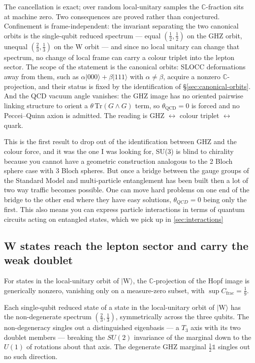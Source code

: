 The cancellation is exact; over random local-unitary samples the $\mathbb{C}$-fraction sits at
machine zero. Two consequences are proved rather than conjectured. Confinement is frame-independent:
the invariant separating the two canonical orbits is the single-qubit reduced spectrum --- equal
$(\tfrac12,\tfrac12)$ on the GHZ orbit, unequal $(\tfrac23,\tfrac13)$ on the W orbit --- and since no
local unitary can change that spectrum, no change of local frame can carry a colour triplet into the
lepton sector. The scope of the statement is the canonical orbits: SLOCC deformations away from them,
such as $\alpha\lvert000\rangle+\beta\lvert111\rangle$ with $\alpha\neq\beta$, acquire a nonzero
$\mathbb{C}$-projection, and their status is fixed by the identification of
\S\ref{sec:canonical-orbits}. And the QCD vacuum angle vanishes: the GHZ image has
no oriented pairwise linking structure to orient a $\theta\,\mathrm{Tr}(G\wedge G)$ term, so
$\theta_{\mathrm{QCD}} = 0$ is forced and no Peccei--Quinn axion is admitted. The reading is
GHZ $\leftrightarrow$ colour triplet $\leftrightarrow$ quark.

This is the first result to drop out of the identification between GHZ and the colour force, and it was the one 
I was looking for, SU(3) is blind to chirality because you cannot have a geometric construction analogous to the 
2 Bloch sphere case with 3 Bloch spheres. But once a bridge between the gauge groups of the Standard Model
and multi-particle entanglement has been built then a lot of two way traffic becomes possible. One can move hard problems
on one end of the bridge to the other end where they have easy solutions, $\theta_{QCD}=0$ being only the first. This also means
you can express particle interactions in terms of quantum circuits acting on entangled states, which we pick up in \ref{sec:interactions}

\subsection{W states reach the lepton sector and carry the weak doublet}

\begin{proposition}[W accessibility]\label{prop:w-access}
For states in the local-unitary orbit of $\lvert\mathrm{W}\rangle$, the $\mathbb{C}$-projection of the
Hopf image is generically nonzero, vanishing only on a measure-zero subset, with
$\sup C_{\mathrm{frac}} = \tfrac19$.
\end{proposition}

\begin{proposition}\label{prop:w-doublet}
Each single-qubit reduced state of a state in the local-unitary orbit of $\lvert\mathrm{W}\rangle$
has the non-degenerate spectrum $(\tfrac23,\tfrac13)$, symmetrically across the three qubits. The
non-degeneracy singles out a distinguished eigenbasis --- a $T_3$ axis with its two doublet members
--- breaking the $SU(2)$ invariance of the marginal down to the $U(1)$ of rotations about that axis.
The degenerate GHZ marginal $\tfrac12\mathbb{1}$ singles out no such direction.
\end{proposition}

